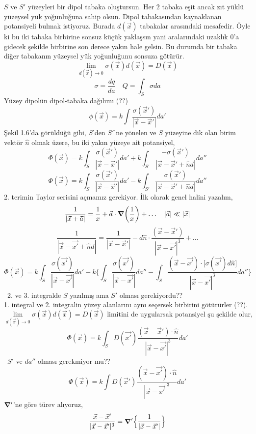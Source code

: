 \begin{theorem}
$S $ ve $S'$ yüzeyleri bir dipol tabaka oluştursun. Her 2 tabaka eşit ancak zıt yüklü yüzeysel yük yoğunluğuna sahip olsun. Dipol tabakasından kaynaklanan potansiyeli bulmak istiyoruz. Burada $d(\vec{x})$ tabakalar arasındaki mesafedir. Öyle ki bu iki tabaka birbirine sonsuz küçük yaklaşsın yani aralarındaki uzaklık $0$'a gidecek şekilde birbirine son derece yakın hale gelsin. Bu durumda bir tabaka diğer tabakanın yüzeysel yük yoğunluğunu sonsuza götürür.
\[ \lim_{d{(\Vec{x}) \rightarrow 0}} \sigma (\Vec{x}) d (\Vec{x}) = D(\Vec{x}) \]
\[ \sigma = \dfrac{dq}{da} \quad Q = \int_{S} \sigma da \]
Yüzey dipolün dipol-tabaka dağılımı (??)
\[ \phi (\Vec{x}) = k \int \dfrac{\sigma (\Vec{x}')}{|\Vec{x} - \Vec{x}'|} da' \tag{1.23} \]
Şekil 1.6'da görüldüğü gibi, $S$'den $S'$'ne yönelen ve $S$ yüzeyine dik olan birim vektör $\hat{n}$ olmak üzere, bu iki yakın yüzeye ait potansiyel,
\[ \Phi(\Vec{x}) = k  \int_{S} \dfrac{\sigma (\Vec{x}')}{|\Vec{x} - \Vec{x}'|} da' + k \int_{S'} \dfrac{- \sigma (\Vec{x}')}{|\Vec{x} - \Vec{x}' + \hat{n}d|} da'' \]
\[ \Phi(\Vec{x}) = k  \int_{S}  \dfrac{\sigma (\Vec{x}')}{|\Vec{x} - \Vec{x}'|} da' - k \int_{S'} \dfrac{\sigma (\Vec{x}')}{|\Vec{x} - \Vec{x}' + \hat{n}d|} da'' \]
2. terimin Taylor serisini açmamız gerekiyor. İlk olarak genel halini yazalım,
\[ \dfrac{1}{|\Vec{x} + \Vec{a}|} = \dfrac{1}{x} + \Vec{a} \cdot \grad (\dfrac{1}{x}) + \dots \quad |\Vec{a}| \ll |\Vec{x}| \]
\[ \dfrac{1}{|\Vec{x} - \Vec{x'} + \hat{n}d|} = \dfrac{1}{|\Vec{x} - \Vec{x}'|} - d\hat{n} \cdot \dfrac{(\Vec{x} - \Vec{x}')}{|\Vec{x} - \Vec{x'}|^{3}} + \dots \]
\[ \Phi (\Vec{x}) = k \int_{S} \dfrac{\sigma (\Vec{x'})}{|\Vec{x} - \Vec{x'}|} da' - k \Bigg\{ \int_{S} \dfrac{\sigma (\Vec{x'})}{|\Vec{x} - \Vec{x'}|} da'' - \int_{S} \dfrac{(\Vec{x} - \Vec{x'}) \cdot \big[ \sigma (\Vec{x'} ) d\hat{n} \big]}{|\Vec{x} - \Vec{x'}|^{3}} da'' \Bigg\} \]
\dangersign \ 2. ve 3. integralde $S$ yazılmış ama $S'$ olması gerekiyordu??\\
1. integral ve 2. integralin yüzey alanlarını aynı seçersek birbirini götürürler (??).
\[ \lim_{d{(\Vec{x}) \rightarrow 0}} \sigma (\Vec{x}) d (\Vec{x}) = D(\Vec{x}) \textrm{ limitini de uygularsak potansiyel şu şekilde olur,}\]
\[ \Phi (\Vec{x}) = k \int_{S} D(\Vec{x'}) \dfrac{(\Vec{x} - \vec{x}') \cdot \hat{n}}{|\Vec{x} - \Vec{x'}|^{3}} da' \]
\dangersign \ $S'$ ve $da''$ olması gerekmiyor mu??
\[ \Phi (\Vec{x}) = k \int D (\Vec{x}') \dfrac{(\Vec{x} - \Vec{x'}) \cdot \hat{n}}{|\Vec{x} - \Vec{x'}|^{3}} da'\]
$\grad'$'ne göre türev alıyoruz,
\[ \dfrac{\Vec{x} - \Vec{x}'}{|\Vec{x} - \Vec{x}'|^{3}} = \grad ' \Big\{ \dfrac{1}{|\Vec{x} - \Vec{x}'|} \Big\}  \]

\end{theorem}
